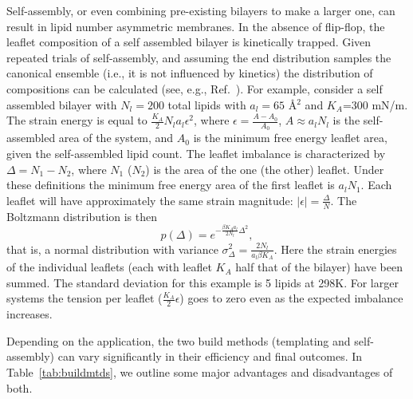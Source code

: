 \documentclass[9pt,bestpractices]{livecoms}
\begin{document}
Self-assembly, or even combining pre-existing bilayers to make a larger one, can result in lipid number asymmetric membranes.
In the absence of flip-flop, the leaflet composition of a self assembled bilayer is kinetically trapped.
Given repeated trials of self-assembly, and assuming the end distribution samples the canonical ensemble (i.e., it is not influenced by kinetics) the distribution of compositions can be calculated (see, e.g., Ref.~\cite{Park2015a}).
For example, consider a self assembled bilayer with $N_l=200$ total lipids with $a_l=65$ \AA$^2$ and $K_A$=300 mN/m.
The strain energy is equal to $\frac{K_A}{2} N_l a_l \epsilon^2$, where $\epsilon=\frac{A-A_0}{A_0}$, $A \approx a_l N_l$ is the self-assembled area of the system, and $A_0$ is the minimum free energy leaflet area, given the self-assembled lipid count. 
The leaflet imbalance is characterized by $\Delta = N_\textrm{1} - N_\textrm{2}$, where $N_{1}$ ($N_2$) is the area of the one (the other) leaflet.
Under these definitions the minimum free energy area of the first leaflet is $a_l N_1$.
Each leaflet will have approximately the same strain magnitude: $|\epsilon| = \frac{\Delta}{N}$.   
The Boltzmann distribution is then
\begin{equation}
p(\Delta) = e^{-\frac{\beta K_A a_l }{2 N_l} \Delta^2}, 
\end{equation}
that is, a normal distribution with variance $\sigma_\Delta^2 = \frac{2 N_l}{a_l \beta K_A}$.
Here the strain energies of the individual leaflets (each with leaflet $K_A$ half that of the bilayer) have been summed.
The standard deviation for this example is 5 lipids at 298K. 
For larger systems the tension per leaflet ($\frac{K_A}{2} \epsilon$) goes to zero even as the expected imbalance increases.

Depending on the application, the two build methods (templating and self-assembly) can vary significantly in their efficiency and final outcomes.
In Table~\ref{tab:buildmtds}, we outline some major advantages and disadvantages of both.
\end{document}
